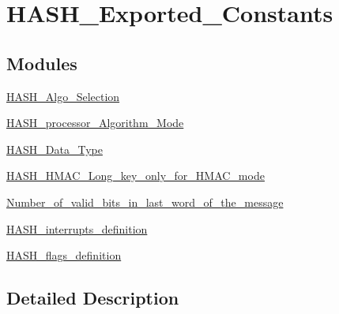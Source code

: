 \hypertarget{group___h_a_s_h___exported___constants}{}\section{H\+A\+S\+H\+\_\+\+Exported\+\_\+\+Constants}
\label{group___h_a_s_h___exported___constants}
\subsection*{Modules}
\begin{DoxyCompactItemize}
\item 
\hyperlink{group___h_a_s_h___algo___selection}{H\+A\+S\+H\+\_\+\+Algo\+\_\+\+Selection}
\item 
\hyperlink{group___h_a_s_h__processor___algorithm___mode}{H\+A\+S\+H\+\_\+processor\+\_\+\+Algorithm\+\_\+\+Mode}
\item 
\hyperlink{group___h_a_s_h___data___type}{H\+A\+S\+H\+\_\+\+Data\+\_\+\+Type}
\item 
\hyperlink{group___h_a_s_h___h_m_a_c___long__key__only__for___h_m_a_c__mode}{H\+A\+S\+H\+\_\+\+H\+M\+A\+C\+\_\+\+Long\+\_\+key\+\_\+only\+\_\+for\+\_\+\+H\+M\+A\+C\+\_\+mode}
\item 
\hyperlink{group___number__of__valid__bits__in__last__word__of__the__message}{Number\+\_\+of\+\_\+valid\+\_\+bits\+\_\+in\+\_\+last\+\_\+word\+\_\+of\+\_\+the\+\_\+message}
\item 
\hyperlink{group___h_a_s_h__interrupts__definition}{H\+A\+S\+H\+\_\+interrupts\+\_\+definition}
\item 
\hyperlink{group___h_a_s_h__flags__definition}{H\+A\+S\+H\+\_\+flags\+\_\+definition}
\end{DoxyCompactItemize}


\subsection{Detailed Description}
